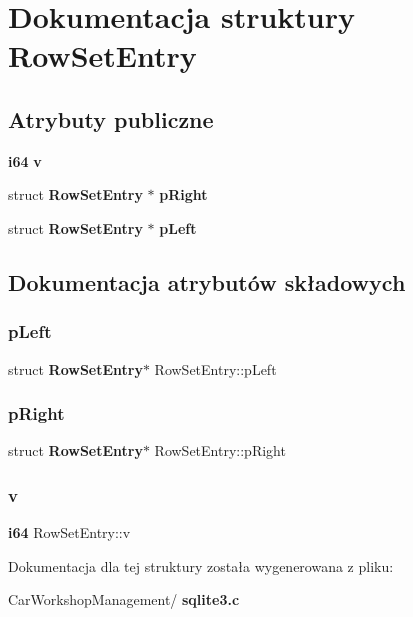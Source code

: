 \section{Dokumentacja struktury Row\+Set\+Entry}
\label{struct_row_set_entry}
\subsection*{Atrybuty publiczne}
\begin{DoxyCompactItemize}
\item 
\textbf{ i64} \textbf{ v}
\item 
struct \textbf{ Row\+Set\+Entry} $\ast$ \textbf{ p\+Right}
\item 
struct \textbf{ Row\+Set\+Entry} $\ast$ \textbf{ p\+Left}
\end{DoxyCompactItemize}


\subsection{Dokumentacja atrybutów składowych}
\mbox{\label{struct_row_set_entry_a59365203c30ce782ae38e534c90db14b}} 
\subsubsection{pLeft}
{\footnotesize\ttfamily struct \textbf{ Row\+Set\+Entry}$\ast$ Row\+Set\+Entry\+::p\+Left}

\mbox{\label{struct_row_set_entry_ac39c09525dd24f42af522587d1bc5026}} 
\subsubsection{pRight}
{\footnotesize\ttfamily struct \textbf{ Row\+Set\+Entry}$\ast$ Row\+Set\+Entry\+::p\+Right}

\mbox{\label{struct_row_set_entry_ac72670935246f1bff5e4d96703574071}} 
\subsubsection{v}
{\footnotesize\ttfamily \textbf{ i64} Row\+Set\+Entry\+::v}



Dokumentacja dla tej struktury została wygenerowana z pliku\+:\begin{DoxyCompactItemize}
\item 
Car\+Workshop\+Management/\textbf{ sqlite3.\+c}\end{DoxyCompactItemize}
